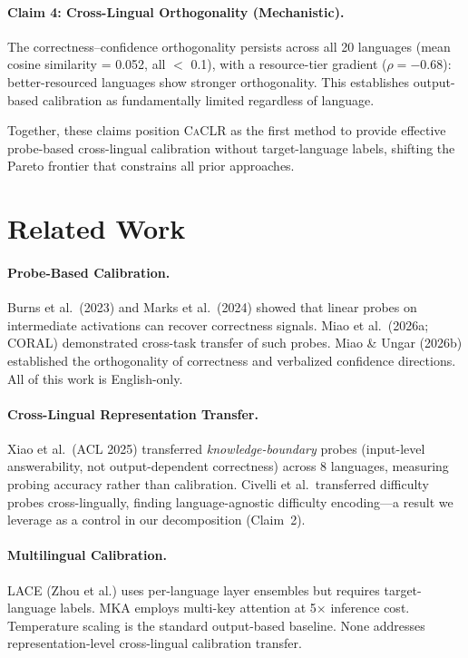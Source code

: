 \documentclass[11pt,a4paper]{article}
\newcommand{\caclr}{\textsc{CaCLR}}
\begin{document}
\paragraph{Claim 4: Cross-Lingual Orthogonality (Mechanistic).}
The correctness--confidence orthogonality persists across all 20 languages (mean cosine similarity = 0.052, all $<$ 0.1), with a resource-tier gradient ($\rho=-0.68$): better-resourced languages show stronger orthogonality. This establishes output-based calibration as fundamentally limited regardless of language.

Together, these claims position \caclr{} as the first method to provide effective probe-based cross-lingual calibration without target-language labels, shifting the Pareto frontier that constrains all prior approaches.

\section{Related Work}
\label{sec:related}

\paragraph{Probe-Based Calibration.}
Burns et al.\ (2023) and Marks et al.\ (2024) showed that linear probes on intermediate activations can recover correctness signals. Miao et al.\ (2026a; CORAL) demonstrated cross-task transfer of such probes. Miao \& Ungar (2026b) established the orthogonality of correctness and verbalized confidence directions. All of this work is English-only.

\paragraph{Cross-Lingual Representation Transfer.}
Xiao et al.\ (ACL 2025) transferred \emph{knowledge-boundary} probes (input-level answerability, not output-dependent correctness) across 8 languages, measuring probing accuracy rather than calibration. Civelli et al.\ transferred difficulty probes cross-lingually, finding language-agnostic difficulty encoding---a result we leverage as a control in our decomposition (Claim~2).

\paragraph{Multilingual Calibration.}
LACE (Zhou et al.) uses per-language layer ensembles but requires target-language labels. MKA employs multi-key attention at 5$\times$ inference cost. Temperature scaling is the standard output-based baseline. None addresses representation-level cross-lingual calibration transfer.
\end{document}
